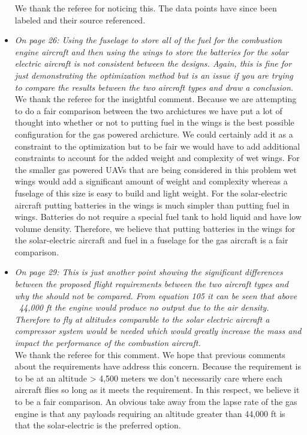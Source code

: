 \documentclass[10pt, a4paper]{article}
\begin{document}
\begin{itemize}
        We thank the referee for noticing this.  The data points have since been labeled and their source referenced.  \\

    \item \emph{On page 26: Using the fuselage to store all of the fuel for the combustion engine aircraft and then using the wings to store the batteries for the solar electric aircraft is not consistent between the designs. Again, this is fine for just demonstrating the optimization method but is an issue if you are trying to compare the results between the two aircraft types and draw a conclusion.} \\

        We thank the referee for the insightful comment.  Because we are attempting to do a fair comparison between the two archictures we have put a lot of thought into whether or not to putting fuel in the wings is the best possible configuration for the gas powered archicture.  We could certainly add it as a constraint to the optimization but to be fair we would have to add additional constraints to account for the added weight and complexity of wet wings.  For the smaller gas powered UAVs that are being considered in this problem wet wings would add a significant amount of weight and complexity whereas a fuselage of this size is easy to build and light weight.  
        For the solar-electric aircraft putting batteries in the wings is much simpler than putting fuel in wings.  
        Batteries do not require a special fuel tank to hold liquid and have low volume density.  
        Therefore, we believe that putting batteries in the wings for the solar-electric aircraft and fuel in a fuselage for the gas aircraft is a fair comparison.  \\

    \item \emph{On page 29: This is just another point showing the significant differences between the proposed flight requirements between the two aircraft types and why the should not be compared. From equation 105 it can be seen that above ~44,000 ft the engine would produce no output due to the air density. Therefore to fly at altitudes comparable to the solar electric aircraft a compressor system would be needed which would greatly increase the mass and impact the performance of the combustion aircraft.} \\

        We thank the referee for this comment.  We hope that previous comments about the requirements have address this concern.  
        Because the requirement is to be at an altitude > 4,500 meters we don't necessarily care where each aircraft flies so long as it meets the requirement.  
        In this respect, we believe it to be a fair comparison.  
        An obvious take away from the lapse rate of the gas engine is that any payloads requiring an altitude greater than 44,000 ft is that the solar-electric is the preferred option. \\


\end{itemize}
\end{document}
